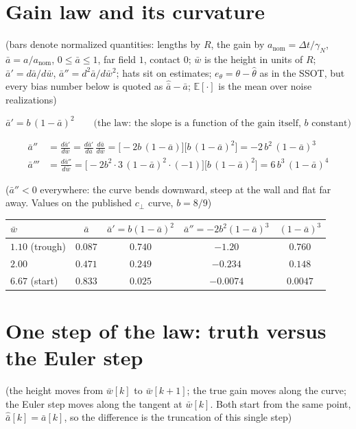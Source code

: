 \documentclass[11pt,a4paper,fontset=none]{ctexart}
\newcommand{\ba}{\bar{a}}
\newcommand{\bw}{\bar{w}}
\newcommand{\E}{\mathbb{E}}
\begin{document}
\section{Gain law and its curvature}

(bars denote normalized quantities: lengths by $R$, the gain by
$a_{\mathrm{nom}} = \Delta t/\gamma_N$, $\ba = a/a_{\mathrm{nom}}$,
$0 \le \ba \le 1$, far field $1$, contact $0$; $\bw$ is the height in units of $R$;
$\ba' = d\ba/d\bw$, $\ba'' = d^{2}\ba/d\bw^{2}$;
hats sit on estimates; $e_{\theta} = \theta - \hat{\theta}$ as in the SSOT,
but every bias number below is quoted as $\hat{\ba} - \ba$;
$\E[\cdot]$ is the mean over noise realizations)

\begin{equation*}
\ba' = b\,(1-\ba)^{2}
\qquad\text{(the law: the slope is a function of the gain itself, } b \text{ constant)}
\end{equation*}

\begin{align*}
\ba'' &= \frac{d\ba'}{d\bw}
      = \frac{d\ba'}{d\ba}\,\frac{d\ba}{d\bw}
      = \bigl[-2b\,(1-\ba)\bigr]\bigl[b\,(1-\ba)^{2}\bigr]
      = -2\,b^{2}\,(1-\ba)^{3} \\
\ba''' &= \frac{d\ba''}{d\bw}
      = \bigl[-2b^{2}\cdot 3\,(1-\ba)^{2}\cdot(-1)\bigr]\bigl[b\,(1-\ba)^{2}\bigr]
      = 6\,b^{3}\,(1-\ba)^{4}
\end{align*}

($\ba'' < 0$ everywhere: the curve bends downward, steep at the wall and flat
far away. Values on the published $c_\perp$ curve, $b = 8/9$)

\begin{center}
\begin{tabular}{lcccc}
$\bw$ & $\ba$ & $\ba' = b(1-\ba)^{2}$ & $\ba'' = -2b^{2}(1-\ba)^{3}$ & $(1-\ba)^{3}$ \\
\hline
$1.10$ (trough) & $0.087$ & $0.740$ & $-1.20$   & $0.760$ \\
$2.00$          & $0.471$ & $0.249$ & $-0.234$  & $0.148$ \\
$6.67$ (start)  & $0.833$ & $0.025$ & $-0.0074$ & $0.0047$
\end{tabular}
\end{center}

\section{One step of the law: truth versus the Euler step}

(the height moves from $\bw[k]$ to $\bw[k+1]$; the true gain moves along the
curve; the Euler step moves along the tangent at $\bw[k]$. Both start from the
same point, $\hat{\ba}[k] = \ba[k]$, so the difference is the truncation of
this single step)
\end{document}
